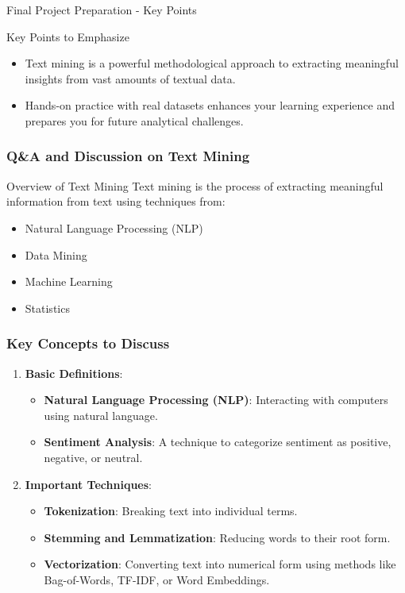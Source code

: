 \documentclass[aspectratio=169]{beamer}
\begin{document}
\begin{frame}[fragile]{Final Project Preparation - Key Points}
    \begin{block}{Key Points to Emphasize}
        \begin{itemize}
            \item Text mining is a powerful methodological approach to extracting meaningful insights from vast amounts of textual data.
            \item Hands-on practice with real datasets enhances your learning experience and prepares you for future analytical challenges.
        \end{itemize}
    \end{block}
\end{frame}

\begin{frame}[fragile]
    \frametitle{Q\&A and Discussion on Text Mining}
    \begin{block}{Overview of Text Mining}
        Text mining is the process of extracting meaningful information from text using techniques from:
        \begin{itemize}
            \item Natural Language Processing (NLP)
            \item Data Mining
            \item Machine Learning
            \item Statistics
        \end{itemize}
    \end{block}
\end{frame}

\begin{frame}[fragile]
    \frametitle{Key Concepts to Discuss}
    \begin{enumerate}
        \item \textbf{Basic Definitions}:
            \begin{itemize}
                \item \textbf{Natural Language Processing (NLP)}: Interacting with computers using natural language.
                \item \textbf{Sentiment Analysis}: A technique to categorize sentiment as positive, negative, or neutral.
            \end{itemize}
        \item \textbf{Important Techniques}:
            \begin{itemize}
                \item \textbf{Tokenization}: Breaking text into individual terms.
                \item \textbf{Stemming and Lemmatization}: Reducing words to their root form.
                \item \textbf{Vectorization}: Converting text into numerical form using methods like Bag-of-Words, TF-IDF, or Word Embeddings.
            \end{itemize}
    \end{enumerate}
\end{frame}
\end{document}
